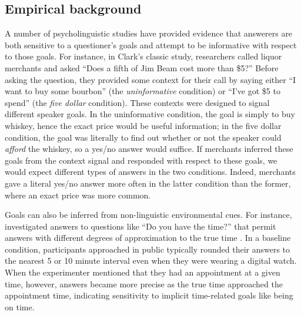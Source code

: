 \documentclass[12pt, floatsintext, jou]{apa6}
\begin{document}
\subsection{Empirical background}

A number of psycholinguistic studies have provided evidence that answerers are both sensitive to a questioner's goals and attempt to be informative with respect to those goals.
For instance, in Clark's \citeyear{Clark79_IndirectSpeechActs} classic study, researchers called liquor merchants and asked ``Does a fifth of Jim Beam cost more than \$5?'' Before asking the question, they provided some context for their call by saying either ``I want to buy some bourbon'' (the \emph{uninformative} condition) or ``I've got \$5 to spend'' (the \emph{five dollar} condition). 
These contexts were designed to signal different speaker goals. In the uninformative condition, the goal is simply to buy whiskey, hence the exact price would be useful information; in the five dollar condition, the goal was literally to find out whether or not the speaker could \emph{afford} the whiskey, so a yes/no answer would suffice. 
If merchants inferred these goals from the context signal and responded with respect to these goals, we would expect different types of answers in the two conditions. Indeed, merchants gave a literal yes/no answer more often in the latter condition than the former, where an exact price was more common. 

Goals can also be inferred from non-linguistic environmental cues. For instance,  investigated answers to questions like ``Do you have the time?'' that permit answers with different degrees of approximation to the true time \cite<see also>{GibbsBryant08_OptimalRelevance}. In a baseline condition, participants approached in public typically rounded their answers to the nearest 5 or 10 minute interval even when they were wearing a digital watch. 
When the experimenter mentioned that they had an appointment at a given time, however, answers became more precise as the true time approached the appointment time, indicating sensitivity to implicit time-related goals like being on time.  
\end{document}
